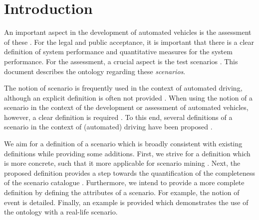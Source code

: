 \section{Introduction}
\label{sec:introduction}

An important aspect in the development of automated vehicles is the assessment of these \cite{bengler2014threedecades, stellet2015taxonomy, Helmer2017safety, putz2017pegasus, roesener2017comprehensive, gietelink2006development}. For the legal and public acceptance, it is important that there is a clear definition of system performance and quantitative measures for the system performance. For the assessment, a crucial aspect is the test scenarios \cite{stellet2015taxonomy}. This document describes the ontology regarding these \emph{scenarios}.

The notion of scenario is frequently used in the context of automated driving, although an explicit definition is often not provided \cite{putz2017pegasus, roesener2017comprehensive, gietelink2006development, hulshof2013autonomous, karaduman2013interactivebehavior, englund2016grand, xu2002effects, ebner2011identifying, ploeg2017GCDC, zofka2015datadrivetrafficscenarios}. When using the notion of a scenario in the context of the development or assessment of automated vehicles, however, a clear definition is required \cite{stellet2015taxonomy, Helmer2017safety, alvarez2017prospective, zofka2015datadrivetrafficscenarios, aparicio2013pre, lesemann2011test, putz2017pegasus, geyer2014, ulbrich2015}. To this end, several definitions of a scenario in the context of (automated) driving have been proposed \cite{geyer2014, ulbrich2015, elrofai2016scenario}.

We aim for a definition of a scenario which is broadly consistent with existing definitions \cite{geyer2014, ulbrich2015, elrofai2016scenario} while providing some additions. First, we strive for a definition which is more concrete, such that it more applicable for scenario mining \cite{elrofai2016scenario}. Next, the proposed definition provides a step towards the quantification of the completeness of the scenario catalogue \cite{geyer2014, alvarez2017prospective, stellet2015taxonomy}. Furthermore, we intend to provide a more complete definition by defining the attributes of a scenario. For example, the notion of event is detailed. Finally, an example is provided which demonstrates the use of the ontology with a real-life scenario.

